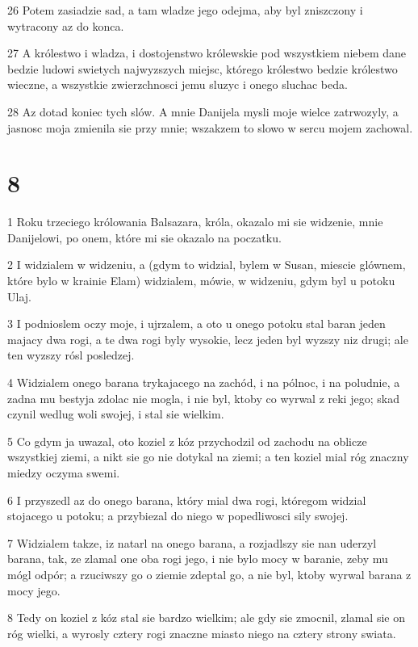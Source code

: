 \par 26 Potem zasiadzie sad, a tam wladze jego odejma, aby byl zniszczony i wytracony az do konca.
\par 27 A królestwo i wladza, i dostojenstwo królewskie pod wszystkiem niebem dane bedzie ludowi swietych najwyzszych miejsc, którego królestwo bedzie królestwo wieczne, a wszystkie zwierzchnosci jemu sluzyc i onego sluchac beda.
\par 28 Az dotad koniec tych slów. A mnie Danijela mysli moje wielce zatrwozyly, a jasnosc moja zmienila sie przy mnie; wszakzem to slowo w sercu mojem zachowal.

\chapter{8}

\par 1 Roku trzeciego królowania Balsazara, króla, okazalo mi sie widzenie, mnie Danijelowi, po onem, które mi sie okazalo na poczatku.
\par 2 I widzialem w widzeniu, a (gdym to widzial, bylem w Susan, miescie glównem, które bylo w krainie Elam) widzialem, mówie, w widzeniu, gdym byl u potoku Ulaj.
\par 3 I podnioslem oczy moje, i ujrzalem, a oto u onego potoku stal baran jeden majacy dwa rogi, a te dwa rogi byly wysokie, lecz jeden byl wyzszy niz drugi; ale ten wyzszy rósl posledzej.
\par 4 Widzialem onego barana trykajacego na zachód, i na pólnoc, i na poludnie, a zadna mu bestyja zdolac nie mogla, i nie byl, ktoby co wyrwal z reki jego; skad czynil wedlug woli swojej, i stal sie wielkim.
\par 5 Co gdym ja uwazal, oto koziel z kóz przychodzil od zachodu na oblicze wszystkiej ziemi, a nikt sie go nie dotykal na ziemi; a ten koziel mial róg znaczny miedzy oczyma swemi.
\par 6 I przyszedl az do onego barana, który mial dwa rogi, któregom widzial stojacego u potoku; a przybiezal do niego w popedliwosci sily swojej.
\par 7 Widzialem takze, iz natarl na onego barana, a rozjadlszy sie nan uderzyl barana, tak, ze zlamal one oba rogi jego, i nie bylo mocy w baranie, zeby mu mógl odpór; a rzuciwszy go o ziemie zdeptal go, a nie byl, ktoby wyrwal barana z mocy jego.
\par 8 Tedy on koziel z kóz stal sie bardzo wielkim; ale gdy sie zmocnil, zlamal sie on róg wielki, a wyrosly cztery rogi znaczne miasto niego na cztery strony swiata.
